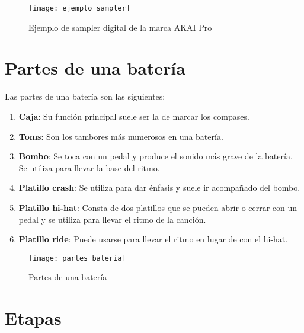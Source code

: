         \newpage

        \begin{figure}[ht]
            \centering
            \texttt{[image: ejemplo\_sampler]}
            \caption{Ejemplo de sampler digital de la marca AKAI Pro\cite{akai_pro_imagen}\label{fig:EjemploSampler}}
        \end{figure}


    \section{Partes de una batería} %
    \label{sec:PartesDeUnaBateria}

        Las partes de una batería son las siguientes:

        \begin{enumerate}
            \item \textbf{Caja}: Su función principal suele ser la de marcar los compases.
            \item \textbf{Toms}: Son los tambores más numerosos en una batería.
            \item \textbf{Bombo}: Se toca con un pedal y produce el sonido más grave de la batería. Se utiliza para
            llevar la base del ritmo.
            \item \textbf{Platillo crash}: Se utiliza para dar énfasis y suele ir acompañado del bombo.
            \item \textbf{Platillo hi-hat}: Consta de dos platillos que se pueden abrir o cerrar con un pedal y se
            utiliza para llevar el ritmo de la canción.
            \item \textbf{Platillo ride}: Puede usarse para llevar el ritmo en lugar de con el hi-hat.
        \end{enumerate}

        \begin{figure}[ht]
            \centering
            \texttt{[image: partes\_bateria]}
            \caption{Partes de una batería\cite{partes_bateria_fuente}\label{fig:PartesBateria}}
        \end{figure}

    
    \section{Etapas} %
    \label{sec:Etapas}

